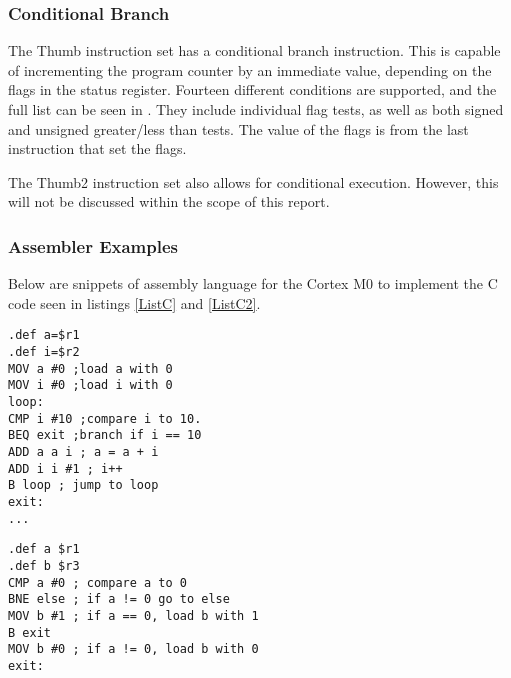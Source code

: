 \documentclass[12pt,a4paper]{article}
\begin{document}
\begin{bibunit}[is-unsrt]
\subsubsection{Conditional Branch}\label{arm:conditionalbranch}
The Thumb instruction set has a conditional branch instruction.
This is capable of incrementing the program counter by an immediate value, depending on the flags in the status register.
Fourteen different conditions are supported, and the full list can be seen in \cite{ARM:Thumb}.
They include individual flag tests, as well as both signed and unsigned greater/less than tests.
The value of the flags is from the last instruction that set the flags.%

The Thumb2 instruction set also allows for conditional execution. 
However, this will not be discussed within the scope of this report.

\subsubsection{Assembler Examples}
Below are snippets of assembly language for the Cortex M0 to implement the C code seen in listings \ref{ListC} and \ref{ListC2}.
\begin{lstlisting}[frame=single,caption=Thumb/Thumb2 Assembler for code in listing \ref{ListC},label=ARM1]
.def a=$r1
.def i=$r2
MOV a #0 ;load a with 0
MOV i #0 ;load i with 0
loop:
CMP i #10 ;compare i to 10.
BEQ exit ;branch if i == 10
ADD a a i ; a = a + i 
ADD i i #1 ; i++ 
B loop ; jump to loop 
exit: 
...
\end{lstlisting}


\begin{lstlisting}[frame=single,caption=Thumb/Thumb2 Assembler for code in listing \ref{ListC2},label=ARM2]
.def a $r1
.def b $r3
CMP a #0 ; compare a to 0
BNE else ; if a != 0 go to else
MOV b #1 ; if a == 0, load b with 1
B exit
MOV b #0 ; if a != 0, load b with 0
exit:
\end{lstlisting}


\end{bibunit}
\end{document}

